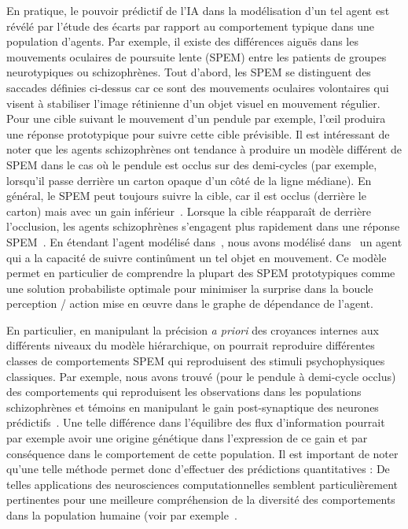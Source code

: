 En pratique, le pouvoir prédictif de l'IA dans la modélisation d'un tel
agent est révélé par l'étude des écarts par rapport au comportement
typique dans une population d'agents. Par exemple, il existe des
différences aiguës dans les mouvements oculaires de poursuite lente
(SPEM) entre les patients de groupes neurotypiques ou schizophrènes.
Tout d'abord, les SPEM se distinguent des saccades définies
ci-dessus car ce sont des mouvements oculaires volontaires qui visent à
stabiliser l'image rétinienne d'un objet visuel en mouvement régulier.
Pour une cible suivant le mouvement d'un pendule par exemple, l'œil
produira une réponse prototypique pour suivre cette cible prévisible. Il
est intéressant de noter que les agents schizophrènes ont tendance à
produire un modèle différent de SPEM dans le cas où le pendule est
occlus sur des demi-cycles (par exemple, lorsqu'il passe derrière un
carton opaque d'un côté de la ligne médiane). En général, le SPEM peut
toujours suivre la cible, car il est occlus (derrière le carton) mais
avec un gain inférieur~\citep{Barnes91}. Lorsque la cible
réapparaît de derrière l'occlusion, les agents schizophrènes s'engagent
plus rapidement dans une réponse SPEM~\citep{Avila06}. En étendant
l'agent modélisé dans~\citep{Friston12}, nous avons  modélisé dans~\citep{Adams12}
un agent qui a la capacité de suivre continûment un tel objet en mouvement.
Ce modèle permet en particulier de
comprendre la plupart des SPEM prototypiques comme une solution
probabiliste optimale  pour minimiser la surprise dans la boucle perception
/ action mise en œuvre dans le graphe de dépendance de l'agent.

En particulier, en manipulant la précision \emph{a priori} des croyances
internes aux différents niveaux du modèle hiérarchique, on pourrait
reproduire différentes classes de comportements SPEM qui reproduisent
des stimuli psychophysiques classiques. Par exemple, nous avons trouvé (pour le pendule à demi-cycle occlus) des comportements qui reproduisent les observations dans les populations schizophrènes et témoins en manipulant
le gain post-synaptique des neurones
prédictifs~\citep{Adams12}. Une
telle différence dans l'équilibre des flux d'information pourrait par
exemple avoir une origine génétique dans l'expression de ce gain et par
conséquence dans le comportement de cette population. Il est important
de noter qu'une telle méthode permet donc d'effectuer des prédictions
quantitatives : De telles applications des neurosciences
computationnelles semblent particulièrement pertinentes pour une
meilleure compréhension de la diversité des comportements dans la
population humaine (voir par exemple~\citep{Karvelis18autistic,Kent19}.

